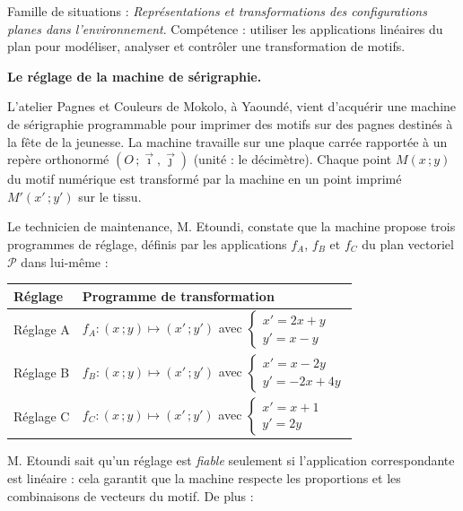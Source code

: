 \documentclass[11pt]{article}
\newcommand{\cle}[1]{{\popxbold\color{popdark}#1}}
\newcounter{popsec}
\newcounter{popsub}
\newcommand{\courssub}[1]{%
  \stepcounter{popsub}%
  \par\vspace{9pt}\noindent{\popxbold\fontsize{11.5}{13}\selectfont\color{popink}{\color{poporange}\thepopsec.\thepopsub}\hspace{6pt}#1}\par\nopagebreak\vspace{4pt}
}
\begin{document}
\begin{aretenir}
Famille de situations : \emph{Représentations et transformations des configurations planes dans l'environnement}. Compétence : utiliser les applications linéaires du plan pour modéliser, analyser et contrôler une transformation de motifs.
\end{aretenir}

\courssub{Situation}

\textbf{Le réglage de la machine de sérigraphie.}

\medskip

L'atelier \og Pagnes et Couleurs \fg{} de Mokolo, à Yaoundé, vient d'acquérir une machine de sérigraphie programmable pour imprimer des motifs sur des pagnes destinés à la fête de la jeunesse. La machine travaille sur une plaque carrée rapportée à un repère orthonormé $(O\,;\vec{\imath},\vec{\jmath})$ (unité : le décimètre). Chaque point $M(x\,;y)$ du motif numérique est transformé par la machine en un point imprimé $M'(x'\,;y')$ sur le tissu.

Le technicien de maintenance, M. Etoundi, constate que la machine propose trois programmes de réglage, définis par les applications $f_A$, $f_B$ et $f_C$ du plan vectoriel $\mathcal{P}$ dans lui-même :

\begin{center}
\begin{tabularx}{\linewidth}{|l|X|}
\hline
\rowcolor{popblueL}
\textbf{Réglage} & \textbf{Programme de transformation} \\
\hline
Réglage A & $f_A : (x\,;y) \longmapsto (x'\,;y')$ avec $\begin{cases} x' = 2x + y \\ y' = x - y \end{cases}$ \\
\hline
Réglage B & $f_B : (x\,;y) \longmapsto (x'\,;y')$ avec $\begin{cases} x' = x - 2y \\ y' = -2x + 4y \end{cases}$ \\
\hline
Réglage C & $f_C : (x\,;y) \longmapsto (x'\,;y')$ avec $\begin{cases} x' = x + 1 \\ y' = 2y \end{cases}$ \\
\hline
\end{tabularx}
\end{center}

M. Etoundi sait qu'un réglage est \emph{fiable} seulement si l'application correspondante est \cle{linéaire} : cela garantit que la machine respecte les proportions et les combinaisons de vecteurs du motif. De plus :
\end{document}
